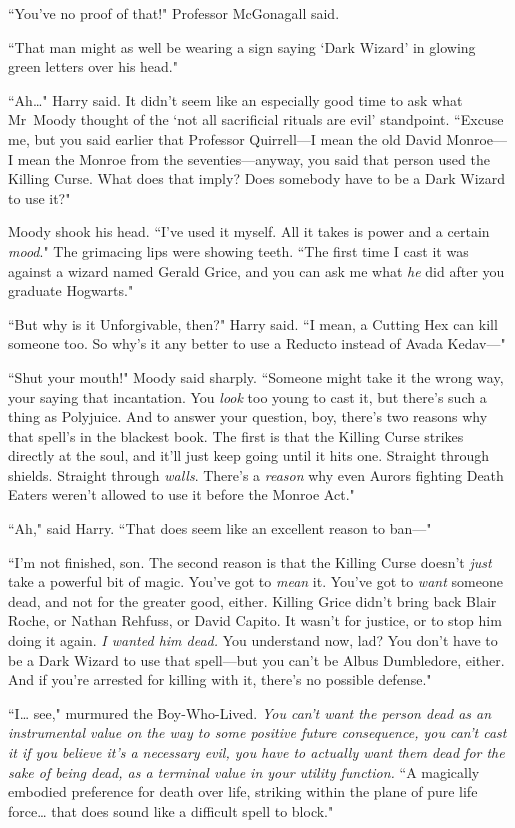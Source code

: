 ``You've no proof of that!" Professor McGonagall said.

``That man might as well be wearing a sign saying `Dark Wizard' in glowing green letters over his head."

``Ah{\ldots}" Harry said. It didn't seem like an especially good time to ask what Mr~Moody thought of the `not all sacrificial rituals are evil' standpoint. ``Excuse me, but you said earlier that Professor Quirrell—I mean the old David Monroe—I mean the Monroe from the seventies—anyway, you said that person used the Killing Curse. What does that imply? Does somebody have to be a Dark Wizard to use it?"

Moody shook his head. ``I've used it myself. All it takes is power and a certain \emph{mood}." The grimacing lips were showing teeth. ``The first time I cast it was against a wizard named Gerald Grice, and you can ask me what \emph{he} did after you graduate Hogwarts."

``But why is it Unforgivable, then?" Harry said. ``I mean, a Cutting Hex can kill someone too. So why's it any better to use a Reducto instead of Avada Kedav—"

``Shut your mouth!" Moody said sharply. ``Someone might take it the wrong way, your saying that incantation. You \emph{look} too young to cast it, but there's such a thing as Polyjuice. And to answer your question, boy, there's two reasons why that spell's in the blackest book. The first is that the Killing Curse strikes directly at the soul, and it'll just keep going until it hits one. Straight through shields. Straight through \emph{walls}. There's a \emph{reason} why even Aurors fighting Death Eaters weren't allowed to use it before the Monroe Act."

``Ah," said Harry. ``That does seem like an excellent reason to ban—"

``I'm not finished, son. The second reason is that the Killing Curse doesn't \emph{just} take a powerful bit of magic. You've got to \emph{mean} it. You've got to \emph{want} someone dead, and not for the greater good, either. Killing Grice didn't bring back Blair Roche, or Nathan Rehfuss, or David Capito. It wasn't for justice, or to stop him doing it again. \emph{I wanted him dead.} You understand now, lad? You don't have to be a Dark Wizard to use that spell—but you can't be Albus Dumbledore, either. And if you're arrested for killing with it, there's no possible defense."

``I{\ldots} see," murmured the Boy-Who-Lived. \emph{You can't want the person dead as an instrumental value on the way to some positive future consequence, you can't cast it if you believe it's a necessary evil, you have to actually want them dead for the sake of being dead, as a terminal value in your utility function.} ``A magically embodied preference for death over life, striking within the plane of pure life force{\ldots} that does sound like a difficult spell to block."

